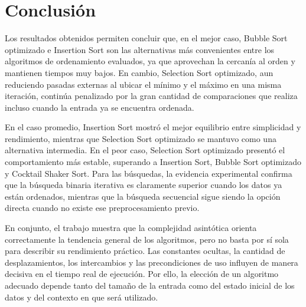 \chapter{Conclusión}
Los resultados obtenidos permiten concluir que, en el mejor caso, Bubble Sort optimizado e Insertion Sort son las alternativas más convenientes entre los algoritmos de ordenamiento evaluados, ya que aprovechan la cercanía al orden y mantienen tiempos muy bajos. En cambio, Selection Sort optimizado, aun reduciendo pasadas externas al ubicar el mínimo y el máximo en una misma iteración, continúa penalizado por la gran cantidad de comparaciones que realiza incluso cuando la entrada ya se encuentra ordenada.

En el caso promedio, Insertion Sort mostró el mejor equilibrio entre simplicidad y rendimiento, mientras que Selection Sort optimizado se mantuvo como una alternativa intermedia. En el peor caso, Selection Sort optimizado presentó el comportamiento más estable, superando a Insertion Sort, Bubble Sort optimizado y Cocktail Shaker Sort. Para las búsquedas, la evidencia experimental confirma que la búsqueda binaria iterativa es claramente superior cuando los datos ya están ordenados, mientras que la búsqueda secuencial sigue siendo la opción directa cuando no existe ese preprocesamiento previo.

En conjunto, el trabajo muestra que la complejidad asintótica orienta correctamente la tendencia general de los algoritmos, pero no basta por sí sola para describir su rendimiento práctico. Las constantes ocultas, la cantidad de desplazamientos, los intercambios y las precondiciones de uso influyen de manera decisiva en el tiempo real de ejecución. Por ello, la elección de un algoritmo adecuado depende tanto del tamaño de la entrada como del estado inicial de los datos y del contexto en que será utilizado.
